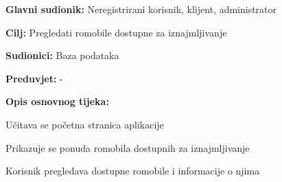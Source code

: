 					
					\noindent {}
					\begin{packed_item}
	
						\item \textbf{Glavni sudionik: }Neregistrirani korisnik, klijent, administrator 
						\item  \textbf{Cilj:} Pregledati romobile dostupne za iznajmljivanje
						\item  \textbf{Sudionici:} Baza podataka
						\item  \textbf{Preduvjet:} -
						\item  \textbf{Opis osnovnog tijeka:}
						
						\item[] \begin{packed_enum}
	
							\item Učitava se početna stranica aplikacije
							\item Prikazuje se ponuda romobila dostupnih za iznajmljivanje
							\item Korisnik pregledava dostupne romobile i informacije o njima
						
						\end{packed_enum}
					\end{packed_item}
						
